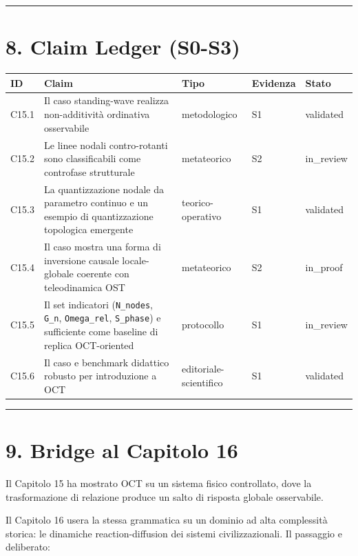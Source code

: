 \begin{center}\rule{0.5\linewidth}{0.5pt}\end{center}

\section{8. Claim Ledger (S0-S3)}

{\def\LTcaptype{none} %
\begin{longtable}[]{@{}lllll@{}}
\toprule\noalign{}
ID & Claim & Tipo & Evidenza & Stato \\
\midrule\noalign{}
\endhead
\bottomrule\noalign{}
\endlastfoot
C15.1 & Il caso standing-wave realizza non-additività ordinativa osservabile & metodologico & S1 & validated \\
C15.2 & Le linee nodali contro-rotanti sono classificabili come controfase strutturale & metateorico & S2 & in\_review \\
C15.3 & La quantizzazione nodale da parametro continuo e un esempio di quantizzazione topologica emergente & teorico-operativo & S1 & validated \\
C15.4 & Il caso mostra una forma di inversione causale locale-globale coerente con teleodinamica OST & metateorico & S2 & in\_proof \\
C15.5 & Il set indicatori (\texttt{N\_nodes}, \texttt{G\_n}, \texttt{Omega\_rel}, \texttt{S\_phase}) e sufficiente come baseline di replica OCT-oriented & protocollo & S1 & in\_review \\
C15.6 & Il caso e benchmark didattico robusto per introduzione a OCT & editoriale-scientifico & S1 & validated \\
\end{longtable}
}

\begin{center}\rule{0.5\linewidth}{0.5pt}\end{center}

\section{9. Bridge al Capitolo 16}

Il Capitolo 15 ha mostrato OCT su un sistema fisico controllato, dove la trasformazione di relazione produce un salto di risposta globale osservabile.

Il Capitolo 16 usera la stessa grammatica su un dominio ad alta complessità storica: le dinamiche reaction-diffusion dei sistemi civilizzazionali. Il passaggio e deliberato:

